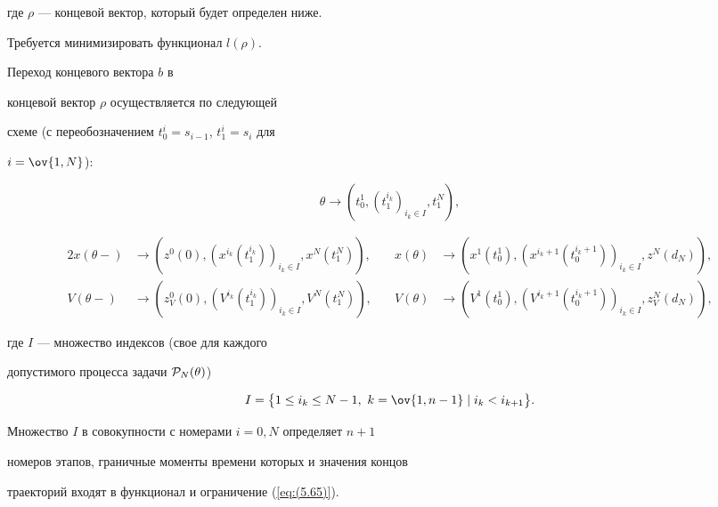 где $\rho$ --- концевой вектор, который будет определен ниже.





Требуется минимизировать функционал $l(\rho)$.





Переход концевого вектора $b$ в


концевой вектор $\rho$ осуществляется по следующей


схеме (с переобозначением $t_0^i=s_{i-1}$, $t_1^i=s_i$ для


$i=\ov{1,N}$):


$$


\theta \rightarrow (t_0^1, (t_1^{i_k})_{i_k\in I} , t_1^{N}),


$$


\begin{alignat*}{2}


x(\theta-) &\rightarrow ( z^0(0),(


x^{i_k}(t_1^{i_k}))_{i_k\in I}, x^N(t_1^N) ), &\quad


x(\theta) &\rightarrow (x^1(t_0^1),


(x^{i_k+1}(t_0^{i_k+1}))_{i_k\in I} , z^{N}(d_N)), \\


%


V(\theta-) &\rightarrow ( z_V^0(0),(


V^{i_k}(t_1^{i_k}))_{i_k\in I}, V^N(t_1^N) ), &\quad


V(\theta) &\rightarrow (V^1(t_0^1),


(V^{i_k+1}(t_0^{i_k+1}))_{i_k\in I} , z_V^{N}(d_N)),


\end{alignat*}


где $I$ --- множество индексов (свое для каждого


допустимого процесса задачи ${\cal P}_N(\theta)$)


$$


I=\big\{1\leq i_k


\leq N-1,\ k=\ov{1,n-1} \mid i_k<i_{k+1} \big\}.


$$


Множество $I$ в совокупности с номерами $i=0,N$ определяет $n+1$


номеров этапов, граничные моменты времени которых и значения концов


траекторий входят в функционал и ограничение (\ref{eq:(5.65)}).





